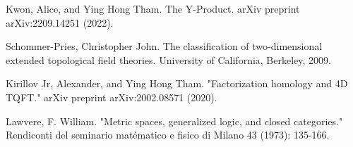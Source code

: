 \documentclass[12pt]{article}
\begin{document}
\begin{thebibliography}{1}

 Kwon, Alice, and Ying Hong Tham. The Y-Product. arXiv preprint arXiv:2209.14251 (2022).

 Schommer-Pries, Christopher John. The classification of two-dimensional extended topological field theories. University of California, Berkeley, 2009.

 Kirillov Jr, Alexander, and Ying Hong Tham. "Factorization homology and 4D TQFT." arXiv preprint arXiv:2002.08571 (2020).

 Lawvere, F. William. "Metric spaces, generalized logic, and closed categories." Rendiconti del seminario matématico e fisico di Milano 43 (1973): 135-166.

\end{thebibliography}
\end{document}
